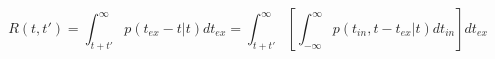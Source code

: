 \begin{equation}
R(t,t') = \int_{t+t'}^\infty p(t_{ex}-t|t) dt_{ex}  = \int_{t+t'}^\infty \left[ \int_{-\infty}^\infty p(t_{in},t-t_{ex}|t) dt_{in} \right]  dt_{ex}
\end{equation}
